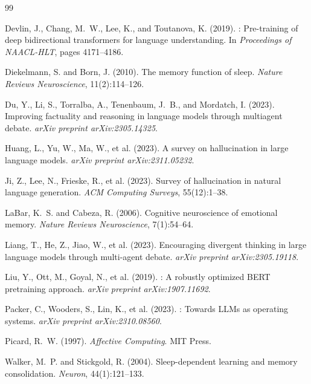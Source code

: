 \documentclass[11pt,a4paper]{article}
\begin{document}

\begin{thebibliography}{99}

Devlin, J., Chang, M.~W., Lee, K., and Toutanova, K. (2019).
: Pre-training of deep bidirectional transformers for language understanding.
\newblock In \emph{Proceedings of NAACL-HLT}, pages 4171--4186.

Diekelmann, S. and Born, J. (2010).
\newblock The memory function of sleep.
\newblock \emph{Nature Reviews Neuroscience}, 11(2):114--126.

Du, Y., Li, S., Torralba, A., Tenenbaum, J.~B., and Mordatch, I. (2023).
\newblock Improving factuality and reasoning in language models through multiagent debate.
\newblock \emph{arXiv preprint arXiv:2305.14325}.

Huang, L., Yu, W., Ma, W., et al. (2023).
\newblock A survey on hallucination in large language models.
\newblock \emph{arXiv preprint arXiv:2311.05232}.

Ji, Z., Lee, N., Frieske, R., et al. (2023).
\newblock Survey of hallucination in natural language generation.
\newblock \emph{ACM Computing Surveys}, 55(12):1--38.

LaBar, K.~S. and Cabeza, R. (2006).
\newblock Cognitive neuroscience of emotional memory.
\newblock \emph{Nature Reviews Neuroscience}, 7(1):54--64.

Liang, T., He, Z., Jiao, W., et al. (2023).
\newblock Encouraging divergent thinking in large language models through multi-agent debate.
\newblock \emph{arXiv preprint arXiv:2305.19118}.

Liu, Y., Ott, M., Goyal, N., et al. (2019).
: A robustly optimized {BERT} pretraining approach.
\newblock \emph{arXiv preprint arXiv:1907.11692}.

Packer, C., Wooders, S., Lin, K., et al. (2023).
: Towards {LLMs} as operating systems.
\newblock \emph{arXiv preprint arXiv:2310.08560}.

Picard, R.~W. (1997).
\newblock \emph{Affective Computing}.
\newblock MIT Press.

Walker, M.~P. and Stickgold, R. (2004).
\newblock Sleep-dependent learning and memory consolidation.
\newblock \emph{Neuron}, 44(1):121--133.

\end{thebibliography}
\end{document}
